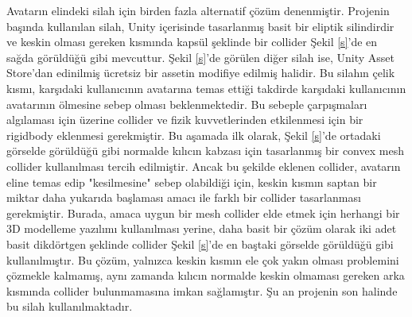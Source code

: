 \documentclass[a4paper, 12pt, titlepage]{article}
\begin{document}
Avatarın elindeki silah için birden fazla alternatif çözüm denenmiştir. Projenin başında kullanılan
silah, Unity içerisinde tasarlanmış basit bir eliptik silindirdir ve keskin olması gereken kısmında
kapsül şeklinde bir collider Şekil \ref{s}’de en sağda görüldüğü gibi mevcuttur. Şekil \ref{s}’de
görülen diğer silah ise, Unity Asset Store’dan edinilmiş ücretsiz bir assetin modifiye edilmiş
halidir. Bu silahın çelik kısmı, karşıdaki kullanıcının avatarına temas ettiği takdirde karşıdaki
kullanıcının avatarının ölmesine sebep olması beklenmektedir. Bu sebeple çarpışmaları algılaması
için üzerine collider ve fizik kuvvetlerinden etkilenmesi için bir rigidbody eklenmesi gerekmiştir.
Bu aşamada ilk olarak, Şekil \ref{s}’de ortadaki görselde görüldüğü gibi normalde kılıcın kabzası
için tasarlanmış bir convex mesh collider kullanılması tercih edilmiştir. Ancak bu şekilde eklenen
collider, avatarın eline temas edip "kesilmesine" sebep olabildiği için, keskin kısmın saptan bir
miktar daha yukarıda başlaması amacı ile farklı bir collider tasarlanması gerekmiştir. Burada,
amaca uygun bir mesh collider elde etmek için herhangi bir 3D modelleme yazılımı kullanılması
yerine, daha basit bir çözüm olarak iki adet basit dikdörtgen şeklinde collider Şekil \ref{s}’de en
baştaki görselde görüldüğü gibi kullanılmıştır. Bu çözüm, yalnızca keskin kısmın ele çok yakın
olması problemini çözmekle kalmamış, aynı zamanda kılıcın normalde keskin olmaması gereken arka
kısmında collider bulunmamasına imkan sağlamıştır. Şu an projenin son halinde bu silah
kullanılmaktadır.

\end{document}
